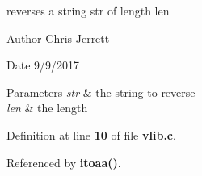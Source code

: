 reverses a string \textquotesingle{}str\textquotesingle{} of length \textquotesingle{}len\textquotesingle{} 

\begin{DoxyAuthor}{Author}
Chris Jerrett 
\end{DoxyAuthor}
\begin{DoxyDate}{Date}
9/9/2017 
\end{DoxyDate}

\begin{DoxyParams}{Parameters}
{\em str} & the string to reverse \\
\hline
{\em len} & the length \\
\hline
\end{DoxyParams}


Definition at line \textbf{ 10} of file \textbf{ vlib.\+c}.



Referenced by \textbf{ itoaa()}.

